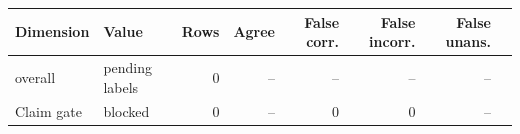 \begin{tabular}{llrrrrrr}
\toprule
Dimension & Value & Rows & Agree & False corr. & False incorr. & False unans. \\
\midrule
overall & pending labels & 0 & -- & -- & -- & -- \\
\midrule
Claim gate & blocked & 0 & -- & 0 & 0 & -- \\
\bottomrule
\end{tabular}
